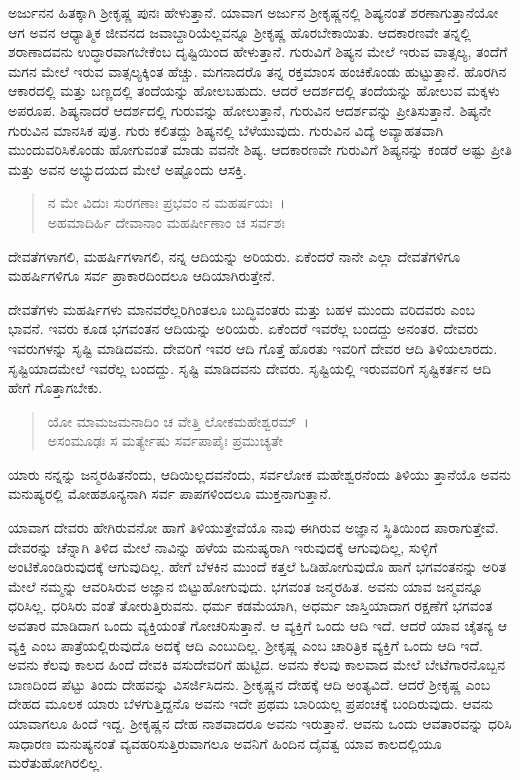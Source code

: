 ಅರ್ಜುನನ ಹಿತಕ್ಕಾಗಿ ಶ‍್ರೀಕೃಷ್ಣ ಪುನಃ ಹೇಳುತ್ತಾನೆ. ಯಾವಾಗ ಅರ್ಜುನ ಶ‍್ರೀಕೃಷ್ಣನಲ್ಲಿ ಶಿಷ್ಯನಂತೆ ಶರಣಾಗುತ್ತಾನೆಯೋ ಆಗ ಅವನ ಆಧ್ಯಾತ್ಮಿಕ ಜೀವನದ ಜವಾಬ್ದಾರಿಯೆಲ್ಲವನ್ನೂ ಶ‍್ರೀಕೃಷ್ಣ ಹೊರಬೇಕಾಯಿತು. ಆದಕಾರಣವೇ ತನ್ನಲ್ಲಿ ಶರಾಣಾದವನು ಉದ್ಧಾರವಾಗಬೇಕೆಂಬ ದೃಷ್ಟಿಯಿಂದ ಹೇಳುತ್ತಾನೆ. ಗುರುವಿಗೆ ಶಿಷ್ಯನ ಮೇಲೆ ಇರುವ ವಾತ್ಸಲ್ಯ, ತಂದೆಗೆ ಮಗನ ಮೇಲೆ ಇರುವ ವಾತ್ಸಲ್ಯಕ್ಕಿಂತ ಹೆಚ್ಚು. ಮಗನಾದರೊ ತನ್ನ ರಕ್ತಮಾಂಸ ಹಂಚಿಕೊಂಡು ಹುಟ್ಟುತ್ತಾನೆ. ಹೊರಗಿನ ಆಕಾರದಲ್ಲಿ ಮತ್ತು ಬಣ್ಣದಲ್ಲಿ ತಂದೆಯನ್ನು ಹೋಲಬಹುದು. ಆದರೆ ಆದರ್ಶದಲ್ಲಿ ತಂದೆಯನ್ನು ಹೋಲುವ ಮಕ್ಕಳು ಅಪರೂಪ. ಶಿಷ್ಯನಾದರೆ ಆದರ್ಶದಲ್ಲಿ ಗುರುವನ್ನು ಹೋಲುತ್ತಾನೆ, ಗುರುವಿನ ಆದರ್ಶವನ್ನು ಪ್ರೀತಿಸುತ್ತಾನೆ. ಶಿಷ್ಯನೇ ಗುರುವಿನ ಮಾನಸಿಕ ಪುತ್ರ. ಗುರು ಕಲಿತದ್ದು ಶಿಷ್ಯನಲ್ಲಿ ಬೆಳೆಯುವುದು. ಗುರುವಿನ ವಿದ್ಯೆ ಅವ್ಯಾಹತವಾಗಿ ಮುಂದುವರಿಸಿಕೊಂಡು ಹೋಗುವಂತೆ ಮಾಡು ವವನೇ ಶಿಷ್ಯ. ಆದಕಾರಣವೇ ಗುರುವಿಗೆ ಶಿಷ್ಯನನ್ನು ಕಂಡರೆ ಅಷ್ಟು ಪ್ರೀತಿ ಮತ್ತು ಅವನ ಅಭ್ಯುದಯದ ಮೇಲೆ ಅಷ್ಟೊಂದು ಆಸಕ್ತಿ.

\begin{verse}
ನ ಮೇ ವಿದುಃ ಸುರಗಣಾಃ ಪ್ರಭವಂ ನ ಮಹರ್ಷಯಃ~।\\ಅಹಮಾದಿರ್ಹಿ ದೇವಾನಾಂ ಮಹರ್ಷೀಣಾಂ ಚ ಸರ್ವಶಃ 
\end{verse}

{\small ದೇವತೆಗಳಾಗಲಿ, ಮಹರ್ಷಿಗಳಾಗಲಿ, ನನ್ನ ಆದಿಯನ್ನು ಅರಿಯರು. ಏಕೆಂದರೆ ನಾನೇ ಎಲ್ಲಾ ದೇವತೆಗಳಿಗೂ ಮಹರ್ಷಿಗಳಿಗೂ ಸರ್ವ ಪ್ರಾಕಾರದಿಂದಲೂ ಆದಿಯಾಗಿರುತ್ತೇನೆ.}

ದೇವತೆಗಳು ಮಹರ್ಷಿಗಳು ಮಾನವರೆಲ್ಲರಿಗಿಂತಲೂ ಬುದ್ಧಿವಂತರು ಮತ್ತು ಬಹಳ ಮುಂದು ವರಿದವರು ಎಂಬ ಭಾವನೆ. ಇವರು ಕೂಡ ಭಗವಂತನ ಆದಿಯನ್ನು ಅರಿಯರು. ಏಕೆಂದರೆ ಇವರೆಲ್ಲ ಬಂದದ್ದು ಅನಂತರ. ದೇವರು ಇವರುಗಳನ್ನು ಸೃಷ್ಟಿ ಮಾಡಿದವನು. ದೇವರಿಗೆ ಇವರ ಆದಿ ಗೊತ್ತೆ ಹೊರತು ಇವರಿಗೆ ದೇವರ ಆದಿ ತಿಳಿಯಲಾರದು. ಸೃಷ್ಟಿಯಾದಮೇಲೆ ಇವರೆಲ್ಲ ಬಂದದ್ದು. ಸೃಷ್ಟಿ ಮಾಡಿದವನು ದೇವರು. ಸೃಷ್ಟಿಯಲ್ಲಿ ಇರುವವರಿಗೆ ಸೃಷ್ಟಿಕರ್ತನ ಆದಿ ಹೇಗೆ ಗೊತ್ತಾಗಬೇಕು.

\begin{verse}
ಯೋ ಮಾಮಜಮನಾದಿಂ ಚ ವೇತ್ತಿ ಲೋಕಮಹೇಶ್ವರಮ್~।\\ಅಸಂಮೂಢಃ ಸ ಮರ್ತ್ಯೇಷು ಸರ್ವಪಾಪೈಃ ಪ್ರಮುಚ್ಯತೇ 
\end{verse}

{\small ಯಾರು ನನ್ನನ್ನು ಜನ್ಮರಹಿತನೆಂದು, ಆದಿಯಿಲ್ಲದವನೆಂದು, ಸರ್ವಲೋಕ ಮಹೇಶ್ವರನೆಂದು ತಿಳಿಯು ತ್ತಾನೆಯೊ ಅವನು ಮನುಷ್ಯರಲ್ಲಿ ಮೋಹಶೂನ್ಯನಾಗಿ ಸರ್ವ ಪಾಪಗಳಿಂದಲೂ ಮುಕ್ತನಾಗುತ್ತಾನೆ.}

ಯಾವಾಗ ದೇವರು ಹೇಗಿರುವನೋ ಹಾಗೆ ತಿಳಿಯುತ್ತೇವೆಯೊ ನಾವು ಈಗಿರುವ ಅಜ್ಞಾನ ಸ್ಥಿತಿಯಿಂದ ಪಾರಾಗುತ್ತೇವೆ. ದೇವರನ್ನು ಚೆನ್ನಾಗಿ ತಿಳಿದ ಮೇಲೆ ನಾವಿನ್ನು ಹಳೆಯ ಮನುಷ್ಯರಾಗಿ ಇರುವುದಕ್ಕೆ ಆಗುವುದಿಲ್ಲ, ಸುಳ್ಳಿಗೆ ಅಂಟಿಕೊಂಡಿರುವುದಕ್ಕೆ ಆಗುವುದಿಲ್ಲ. ಹೇಗೆ ಬೆಳಕಿನ ಮುಂದೆ ಕತ್ತಲೆ ಓಡಿಹೋಗುವುದೊ ಹಾಗೆ ಭಗವಂತನನ್ನು ಅರಿತ ಮೇಲೆ ನಮ್ಮನ್ನು ಆವರಿಸಿರುವ ಅಜ್ಞಾನ ಬಿಟ್ಟುಹೋಗುವುದು. ಭಗವಂತ ಜನ್ಮರಹಿತ. ಅವನು ಯಾವ ಜನ್ಮವನ್ನೂ ಧರಿಸಿಲ್ಲ. ಧರಿಸಿರು ವಂತೆ ತೋರುತ್ತಿರುವನು. ಧರ್ಮ ಕಡಮೆಯಾಗಿ, ಅಧರ್ಮ ಜಾಸ್ತಿಯಾದಾಗ ರಕ್ಷಣೆಗೆ ಭಗವಂತ ಅವತಾರ ಮಾಡಿದಾಗ ಒಂದು ವ್ಯಕ್ತಿಯಂತೆ ಗೋಚರಿಸುತ್ತಾನೆ. ಆ ವ್ಯಕ್ತಿಗೆ ಒಂದು ಆದಿ ಇದೆ. ಆದರೆ ಯಾವ ಚೈತನ್ಯ ಆ ವ್ಯಕ್ತಿ ಎಂಬ ಪಾತ್ರೆಯಲ್ಲಿರುವುದೊ ಅದಕ್ಕೆ ಆದಿ ಎಂಬುದಿಲ್ಲ. ಶ‍್ರೀಕೃಷ್ಣ ಎಂಬ ಚಾರಿತ್ರಿಕ ವ್ಯಕ್ತಿಗೆ ಒಂದು ಆದಿ ಇದೆ. ಅವನು ಕೆಲವು ಕಾಲದ ಹಿಂದೆ ದೇವಕಿ ವಸುದೇವರಿಗೆ ಹುಟ್ಟಿದ. ಅವನು ಕೆಲವು ಕಾಲವಾದ ಮೇಲೆ ಬೇಟೆಗಾರನೊಬ್ಬನ ಬಾಣದಿಂದ ಪೆಟ್ಟು ತಿಂದು ದೇಹವನ್ನು ವಿಸರ್ಜಿಸಿದನು. ಶ‍್ರೀಕೃಷ್ಣನ ದೇಹಕ್ಕೆ ಆದಿ ಅಂತ್ಯವಿದೆ. ಆದರೆ ಶ‍್ರೀಕೃಷ್ಣ ಎಂಬ ದೇಹದ ಮೂಲಕ ಯಾರು ಬೆಳಗುತ್ತಿದ್ದನೊ ಅವನು ಇದೇ ಪ್ರಥಮ ಬಾರಿಯಲ್ಲ ಪ್ರಪಂಚಕ್ಕೆ ಬಂದಿರುವುದು. ಆವನು ಯಾವಾಗಲೂ ಹಿಂದೆ ಇದ್ದ. ಶ‍್ರೀಕೃಷ್ಣನ ದೇಹ ನಾಶವಾದರೂ ಅವನು ಇರುತ್ತಾನೆ. ಆವನು ಒಂದು ಆವತಾರವನ್ನು ಧರಿಸಿ ಸಾಧಾರಣ ಮನುಷ್ಯನಂತೆ ವ್ಯವಹರಿಸುತ್ತಿರುವಾಗಲೂ ಅವನಿಗೆ ಹಿಂದಿನ ದೈವತ್ವ ಯಾವ ಕಾಲದಲ್ಲಿಯೂ ಮರೆತುಹೋಗಿರಲಿಲ್ಲ.

